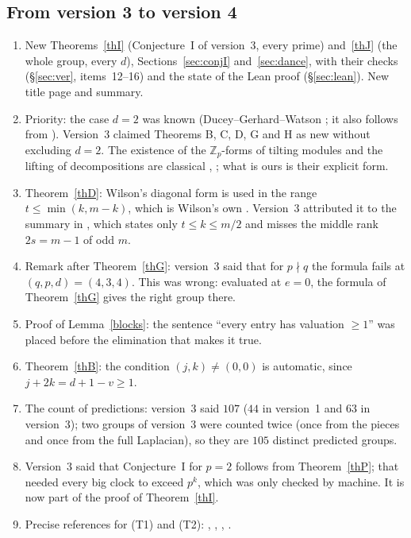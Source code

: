 \documentclass[10pt]{article}
\theoremstyle{ds}
\theoremstyle{dsrem}
\newcommand{\Z}{\mathbb{Z}}
\begin{document}
\subsection*{From version 3 to version 4}
\begin{enumerate}
\item New Theorems~\ref{thI} (Conjecture~I of version~3, every prime) and~\ref{thJ} (the whole group, every $d$), Sections~\ref{sec:conjI} and~\ref{sec:dance}, with their checks (\S\ref{sec:ver}, items~12--16) and the state of the Lean proof (\S\ref{sec:lean}). New title page and summary.
\item Priority: the case $d=2$ was known (Ducey--Gerhard--Watson \cite[Theorem~1.1]{DGW}; it also follows from \cite[Theorem~13 and Example~11]{JNR}). Version~3 claimed Theorems B, C, D, G and H as new without excluding $d=2$. The existence of the $\Z_p$-forms of tilting modules and the lifting of decompositions are classical \cite[\S1.2]{And}, \cite[II.E]{Jan}; what is ours is their explicit form.
\item Theorem~\ref{thD}: Wilson's diagonal form is used in the range $t\le\min(k,m-k)$, which is Wilson's own \cite[Theorem~2]{Wil}. Version~3 attributed it to the summary in \cite[(2)]{CSX}, which states only $t\le k\le m/2$ and misses the middle rank $2s=m-1$ of odd $m$.
\item Remark after Theorem~\ref{thG}: version~3 said that for $p\nmid q$ the formula fails at $(q,p,d)=(4,3,4)$. This was wrong: evaluated at $e=0$, the formula of Theorem~\ref{thG} gives the right group there.
\item Proof of Lemma~\ref{blocks}: the sentence ``every entry has valuation $\ge1$'' was placed before the elimination that makes it true.
\item Theorem~\ref{thB}: the condition $(j,k)\ne(0,0)$ is automatic, since $j+2k=d+1-v\ge1$.
\item The count of predictions: version~3 said $107$ ($44$ in version~1 and $63$ in version~3); two groups of version~3 were counted twice (once from the pieces and once from the full Laplacian), so they are $105$ distinct predicted groups.
\item Version~3 said that Conjecture~I for $p=2$ follows from Theorem~\ref{thP}; that needed every big clock to exceed $p^k$, which was only checked by machine. It is now part of the proof of Theorem~\ref{thI}.
\item Precise references for (T1) and (T2): \cite[II.E.6, II.E.19--E.22]{Jan}, \cite[Prop.~2.1]{Don}, \cite[Prop.~3.4(a)]{STWZ}, \cite[Remark~1.1(ii), \S1.2]{And}.
\end{enumerate}
\end{document}
